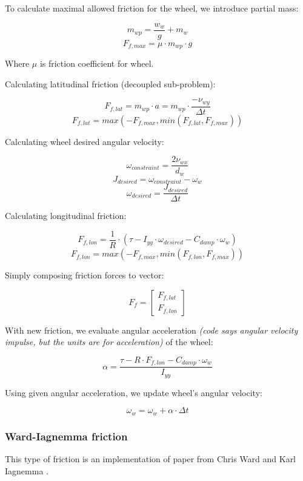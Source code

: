 \documentclass[a4paper,11pt]{article}
\begin{document}
To calculate maximal allowed friction for the wheel, we introduce partial mass:
\begin{center}
\[
m_{wp} = \frac{w_w}{g} + m_w
\]
\[
F_{f, max} = \mu \cdot m_{wp} \cdot g
\]
\end{center}
Where $\mu$ is friction coefficient for wheel.

Calculating latitudinal friction (decoupled sub-problem):
\begin{center}
\[
F_{f,lat} = m_{wp} \cdot a = m_{wp} \cdot \frac{-\nu_{wy}}{\Delta t}
\]
\[
F_{f,lat} = max(-F_{f,max}, min(F_{f,lat}, F_{f,max}))
\]
\end{center}

Calculating wheel desired angular velocity:

\begin{center}
\[
\omega_{constraint} = \frac{2\nu_{wx}}{d_w}
\]
\[
J_{desired} = \omega_{constraint} - \omega_w
\]
\[
\omega_{desired} = \frac{J_{desired}}{\Delta t}
\]
\end{center}


Calculating longitudinal friction:
\begin{center}
\[
F_{f,lon} = \frac{1}{R} \cdot (\tau - I_{yy}\cdot \omega_{desired} - C_{damp} \cdot \omega_w)
\]
\[
F_{f,lon} = max(-F_{f,max}, min(F_{f,lon}, F_{f,max}))
\]
\end{center}

Simply composing friction forces to vector:
\begin{center}
\[
F_f = 
\begin{bmatrix}
F_{f,lat} \\
F_{f,lon}
\end{bmatrix}
\]
\end{center}

With new friction, we evaluate angular acceleration \textit{(code says angular velocity impulse, but the units are for acceleration)}  of the wheel:
\begin{center}
\[
\alpha = \frac{ \tau - R \cdot F_{f,lon} - C_{damp} \cdot \omega_w}{I_{yy}}
\]
\end{center}

Using given angular acceleration, we update wheel's angular velocity:
\begin{center}
$$
\omega_w = \omega_w + \alpha \cdot \Delta t
$$
\end{center}

\newpage
\subsubsection{Ward-Iagnemma friction}
This type of friction is an implementation of paper from Chris Ward and Karl Iagnemma \cite{ward-iagnemma-friction}.
\end{document}

